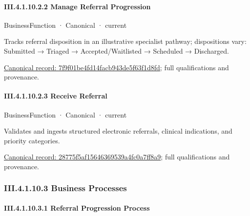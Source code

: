 \paragraph*{III.4.1.10.2.2 Manage Referral Progression}
\label{navigation:III.4.1.10.2.2}

\label{element:7f9f01be4fd14facb943de5f63f1d8fd}
{\small BusinessFunction · Canonical · current}\par

Tracks referral disposition in an illustrative specialist pathway; dispositions vary: Submitted → Triaged → Accepted/Waitlisted → Scheduled → Discharged.


{\footnotesize \href{../../../../../../../continuum/business/business-function/7f9f01be4fd14facb943de5f63f1d8fd.md}{Canonical record: 7f9f01be4fd14facb943de5f63f1d8fd}; full qualifications and provenance.}\par
\paragraph*{III.4.1.10.2.3 Receive Referral}
\label{navigation:III.4.1.10.2.3}

\label{element:28775f5af15646369539a4fc0a7ff8a9}
{\small BusinessFunction · Canonical · current}\par

Validates and ingests structured electronic referrals, clinical indications, and priority categories.


{\footnotesize \href{../../../../../../../continuum/business/business-function/28775f5af15646369539a4fc0a7ff8a9.md}{Canonical record: 28775f5af15646369539a4fc0a7ff8a9}; full qualifications and provenance.}\par
\subsubsection*{III.4.1.10.3 Business Processes}
\label{navigation:III.4.1.10.3}

\paragraph*{III.4.1.10.3.1 Referral Progression Process}
\label{navigation:III.4.1.10.3.1}

